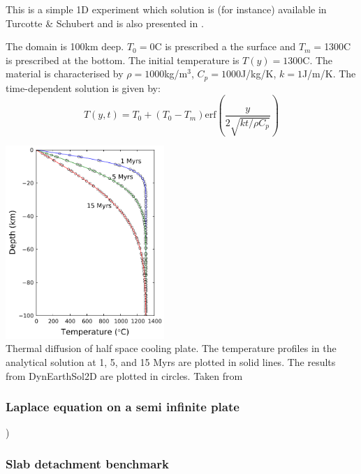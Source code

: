 This is a simple 1D experiment which solution is (for instance) available 
in Turcotte \& Schubert \cite{tusc} and is also presented in \cite{chtl13}.

The domain is 100km deep. $T_0=$0\degree C is prescribed a the surface and 
$T_m=$1300\degree C is prescribed at the bottom. The initial temperature is $T(y)=1300$\degree C.
The material is characterised by $\rho=1000$kg/m$^3$, $C_p=1000$J/kg/K, 
$k=1$J/m/K. The time-dependent solution is given by:
\begin{equation}
T(y,t)=T_0 + (T_0-T_m) \text{erf} \left( \frac{y}{2\sqrt{k t /\rho C_p}}  \right)
\end{equation}

\begin{center}
\includegraphics[width=6cm]{images/benchmark_hcsp/chtl13}\\
{\captionfont Thermal diffusion of half space cooling plate.
The temperature profiles in the analytical solution at 1, 5,
and 15 Myrs are plotted in solid lines. The results from
DynEarthSol2D are plotted in circles. Taken from \cite{chtl13}}
\end{center}


\subsubsection{Laplace equation on a semi infinite plate} \label{sec:lapplate})



\subsubsection{Slab detachment benchmark} \label{sec:slabdetach}


